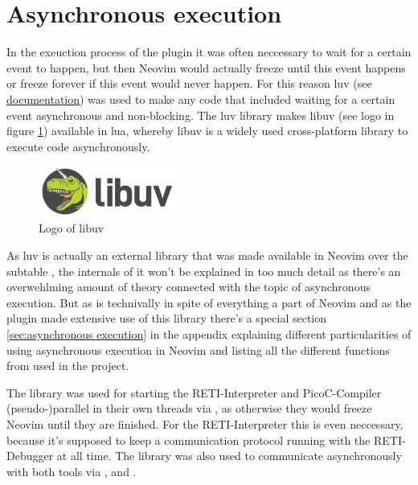\documentclass{report}
\begin{document}

\section{Asynchronous execution}
\label{sec:asynchronous execution with libuv}

In the exeuction process of the plugin it was often neccessary to wait for a certain event to happen, but then Neovim would actually freeze until this event happens or freeze forever if this event would never happen. For this reason \alert{luv}\cite{LuvitLuvBare} (see \href{https://github.com/luvit/luv/blob/master/docs.md}{documentation}) was used to make any code that included waiting for a certain event asynchronous and non-blocking. The luv library makes \alert{libuv}\cite{LibuvLibuvCrossplatform} (see logo in figure \ref{fig:logo of libuv}) available in lua, whereby libuv is a widely used cross-platform library to execute code asynchronously.

\begin{figure}
	\centering
	\includegraphics[width=0.4\textwidth]{./figures/libuv.png}
	\caption{Logo of libuv}
	\label{fig:logo of libuv}
  \vspace{0.25cm}
\end{figure}

As luv is actually an external library that was made available in Neovim over the subtable , the internals of it won't be explained in too much detail as there's an overwehlming amount of theory connected with the topic of asynchronous execution. But as  is technivally in spite of everything a part of Neovim and as the plugin made extensive use of this library there's a special section \ref{sec:asynchronous execution} in the appendix explaining different particularities of using asynchronous execution in Neovim and listing all the different functions from  used in the project.

The library was used for starting the RETI-Interpreter and PicoC-Compiler \alert{(pseudo-)parallel} in their own \alert{threads} via , as otherwise they would freeze Neovim until they are finished. For the RETI-Interpreter this is even neccessary, because it's supposed to keep a communication protocol running with the RETI-Debugger at all time. The library was also used to communicate asynchronously with both tools via ,  and . 
\end{document}
